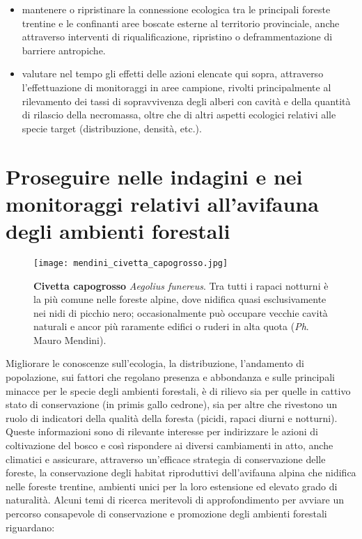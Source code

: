 \documentclass[10pt,twoside,openany,x11names,svgnames,italian,a5paper,dvipsnames,table]{memoir}
\newcommand{\ph}{\emph{Ph}. }
\begin{document}
\begin{itemize}
  \item mantenere o ripristinare la connessione ecologica tra le principali foreste trentine e le confinanti aree boscate esterne al territorio provinciale, anche attraverso interventi di riqualificazione, ripristino o deframmentazione di barriere antropiche.
  \item valutare nel tempo gli effetti delle azioni elencate qui sopra, attraverso l’effettuazione di monitoraggi in aree campione, rivolti principalmente al rilevamento dei tassi di sopravvivenza degli alberi con cavità e della quantità di rilascio della necromassa, oltre che di altri aspetti ecologici relativi alle specie target (distribuzione, densità, etc.).
 \end{itemize}

\newpage
\section[Proseguire nelle indagini e nei monitoraggi]{Proseguire nelle indagini e nei monitoraggi relativi all’avifauna degli ambienti forestali}
\begin{wrapfigure}[24]{r}{.5\columnwidth}
\centering
\captionsetup{width=.5\columnwidth}
  \texttt{[image: mendini\_civetta\_capogrosso.jpg]}
  \caption*{\textbf{Civetta capogrosso} \emph{Aegolius funereus}. Tra tutti i rapaci notturni è la più comune nelle foreste alpine, dove nidifica quasi esclusivamente nei nidi di picchio nero; occasionalmente può occupare vecchie cavità naturali e ancor più raramente edifici o ruderi in alta quota (\ph Mauro Mendini).}
\vspace{15pt}
\end{wrapfigure}
Migliorare le conoscenze sull'ecologia, la distribuzione, l'andamento di popolazione, sui fattori che regolano presenza e abbondanza e sulle principali minacce per le specie degli ambienti forestali, è di rilievo sia per quelle in cattivo stato di conservazione (in primis gallo cedrone), sia per altre che rivestono un ruolo di indicatori della qualità della foresta (picidi, rapaci diurni e notturni). Queste informazioni sono di rilevante interesse per indirizzare le azioni di coltivazione del bosco e così rispondere ai diversi cambiamenti in atto, anche climatici e assicurare, attraverso un'efficace strategia di conservazione delle foreste, la conservazione degli habitat riproduttivi dell’avifauna alpina che nidifica nelle foreste trentine, ambienti unici per la loro estensione ed elevato grado di naturalità.
Alcuni temi di ricerca meritevoli di approfondimento per avviare un percorso consapevole di conservazione e promozione degli ambienti forestali riguardano:
\end{document}
